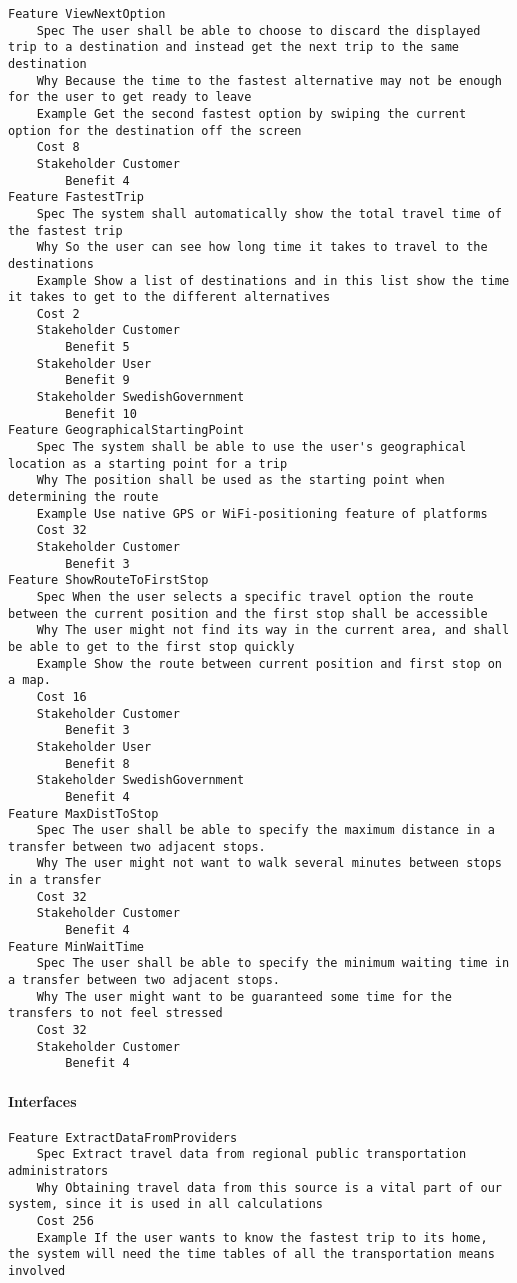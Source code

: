 \begin{lstlisting}
Feature ViewNextOption
	Spec The user shall be able to choose to discard the displayed trip to a destination and instead get the next trip to the same destination
	Why Because the time to the fastest alternative may not be enough for the user to get ready to leave
	Example Get the second fastest option by swiping the current option for the destination off the screen
	Cost 8
	Stakeholder Customer
		Benefit 4
Feature FastestTrip
	Spec The system shall automatically show the total travel time of the fastest trip
	Why So the user can see how long time it takes to travel to the destinations
	Example Show a list of destinations and in this list show the time it takes to get to the different alternatives
	Cost 2
	Stakeholder Customer
		Benefit 5
	Stakeholder User
		Benefit 9
	Stakeholder SwedishGovernment
		Benefit 10
Feature GeographicalStartingPoint
	Spec The system shall be able to use the user's geographical location as a starting point for a trip
	Why The position shall be used as the starting point when determining the route
	Example Use native GPS or WiFi-positioning feature of platforms
	Cost 32
	Stakeholder Customer
		Benefit 3
Feature ShowRouteToFirstStop
	Spec When the user selects a specific travel option the route between the current position and the first stop shall be accessible
	Why The user might not find its way in the current area, and shall be able to get to the first stop quickly
	Example Show the route between current position and first stop on a map.
	Cost 16
	Stakeholder Customer
		Benefit 3
	Stakeholder User
		Benefit 8
	Stakeholder SwedishGovernment
		Benefit 4
Feature MaxDistToStop
	Spec The user shall be able to specify the maximum distance in a transfer between two adjacent stops.
	Why The user might not want to walk several minutes between stops in a transfer
	Cost 32
	Stakeholder Customer
		Benefit 4
Feature MinWaitTime
	Spec The user shall be able to specify the minimum waiting time in a transfer between two adjacent stops.
	Why The user might want to be guaranteed some time for the transfers to not feel stressed
	Cost 32
	Stakeholder Customer
		Benefit 4

\end{lstlisting}
		
				
			 \paragraph{Interfaces}


\begin{lstlisting}
Feature ExtractDataFromProviders
	Spec Extract travel data from regional public transportation administrators
	Why Obtaining travel data from this source is a vital part of our system, since it is used in all calculations
	Cost 256
	Example If the user wants to know the fastest trip to its home, the system will need the time tables of all the transportation means involved

\end{lstlisting}
		
